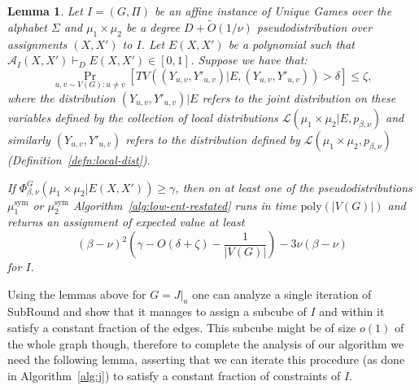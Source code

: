 \documentclass[11pt]{article}
\def \cA {\mathcal{A}}
\def \cL {\mathcal{L}}
\def \sym {\text{sym}}
\def \poly {\mathrm{poly}}
\newtheorem{lemma}[theorem]{Lemma}
\theoremstyle{definition}
\begin{document}
\begin{lemma}\label{lem:round-j}
Let $I = (G, \Pi)$ be an affine instance of Unique Games over the alphabet $\Sigma$ and $\mu_1 \times \mu_2$ be a degree $D+\widetilde{O}(1/\nu)$ pseudodistribution over assignments $(X,X')$ to $I$. Let $E(X,X')$ be a polynomial such that $\cA_I(X,X') \vdash_D E(X,X') \in [0,1]$. Suppose we have that: 
\[\Pr_{u,v \sim V(G): u \neq v}[TV((Y_{u,v},Y'_{u,v})|E , (Y_{u,v},Y'_{u,v})) > \delta] \leq \zeta,\]
where the distribution $(Y_{u,v},Y'_{u,v})|E$ refers to the joint distribution on these variables defined by the collection of local distributions $\cL(\mu_1 \times \mu_2|E, p_{\beta,\nu})$ and similarly $(Y_{u,v},Y'_{u,v})$ refers to the distribution defined by $\cL(\mu_1 \times \mu_2,p_{\beta,\nu})$ (Definition~\ref{defn:local-dist}). 

If $\Phi^G_{\beta,\nu}(\mu_1 \times \mu_2 | E(X,X')) \geq \gamma$, then on at least one of the pseudodistributions $\mu^\sym_1$ or $\mu^\sym_2$ Algorithm~\ref{alg:low-ent-restated} runs in time $\poly(|V(G)|)$ and returns an assignment of expected value at least 
\[
(\beta - \nu)^2\left(\gamma - O(\delta+\zeta) - \frac{1}{|V(G)|}\right) - 3\nu(\beta - \nu)
\]
for $I$.
\end{lemma}

Using the lemmas above for $G = J|_a$ one can analyze a single iteration of SubRound and show that it manages to assign a subcube of $I$ and within it satisfy a constant fraction of the edges. This subcube might be of size $o(1)$ of the whole graph though, therefore to complete the analysis of our algorithm we need the following lemma, asserting that we can iterate this procedure (as done in Algorithm~\ref{alg:j}) to satisfy a constant fraction of constraints of $I$. 
\end{document}
